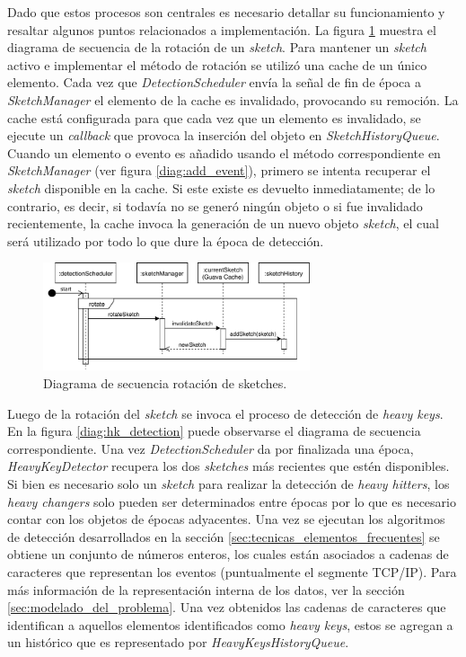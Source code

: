 \documentclass[a4paper,10pt, oneside]{article}
\begin{document}
Dado que estos procesos son centrales es necesario detallar su funcionamiento y resaltar algunos puntos relacionados a implementación.
La figura \ref{diag:sketch_rotation} muestra el diagrama de secuencia de la rotación de un \textit{sketch}. Para mantener un \textit{sketch} activo e implementar el método de rotación se utilizó una cache de un único elemento. Cada vez que \textit{DetectionScheduler} envía la señal de fin de época a \textit{SketchManager} el elemento de la cache es invalidado, provocando su remoción. La cache está configurada para que cada vez que un elemento es invalidado, se ejecute un \textit{callback} que provoca la inserción del objeto en \textit{SketchHistoryQueue}.
Cuando un elemento o evento es añadido usando el método correspondiente en \textit{SketchManager} (ver figura \ref{diag:add_event}), primero se intenta recuperar el \textit{sketch} disponible en la cache. Si este existe es devuelto inmediatamente; de lo contrario, es decir, si todavía no se generó ningún objeto o si fue invalidado recientemente, la cache invoca la generación de un nuevo objeto \textit{sketch}, el cual será utilizado por todo lo que dure la época de detección. 

\begin{figure}[h]
	\centering
	\includegraphics[width=0.7\textwidth]{./graph/SecDiag-detectionSchedulerRotation.pdf}
	\caption{Diagrama de secuencia rotación de sketches.}
	\label{diag:sketch_rotation}
\end{figure}

Luego de la rotación del \textit{sketch} se invoca el proceso de detección de \textit{heavy keys}. En la figura \ref{diag:hk_detection} puede observarse el diagrama de secuencia correspondiente. Una vez \textit{DetectionScheduler} da por finalizada una época, \textit{HeavyKeyDetector} recupera los dos \textit{sketches} más recientes que estén disponibles. Si bien es necesario solo un \textit{sketch} para realizar la detección de \textit{heavy hitters}, los \textit{heavy changers} solo pueden ser determinados entre épocas por lo que es necesario contar con los objetos de épocas adyacentes. Una vez se ejecutan los algoritmos de detección desarrollados en la sección \ref{sec:tecnicas_elementos_frecuentes} se obtiene un conjunto de números enteros, los cuales están asociados a cadenas de caracteres que representan los eventos (puntualmente el segmente TCP/IP). Para más información de la representación interna de los datos, ver la sección \ref{sec:modelado_del_problema}. Una vez obtenidos las cadenas de caracteres que identifican a aquellos elementos identificados como \textit{heavy keys}, estos se agregan a un histórico que es representado por \textit{HeavyKeysHistoryQueue}.
\end{document}
